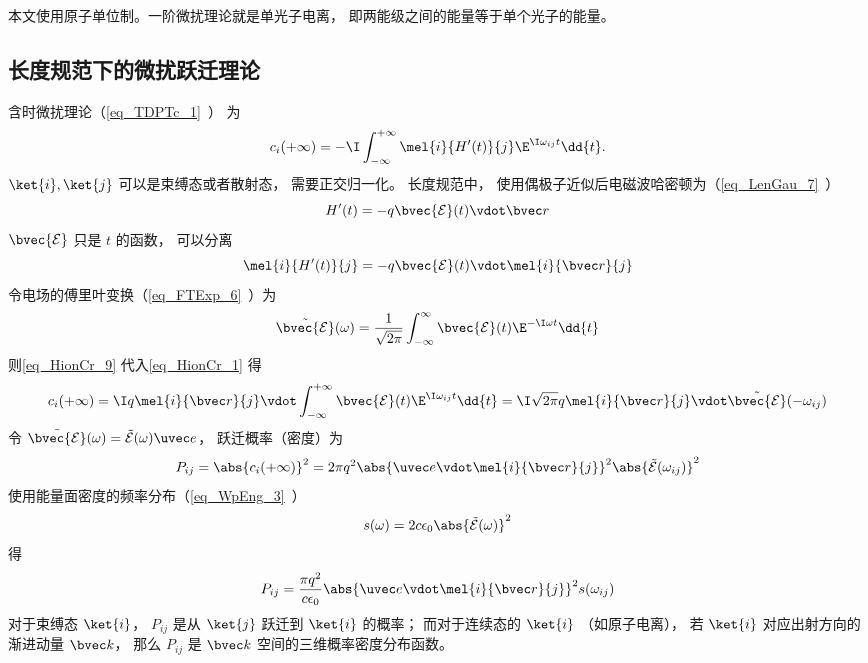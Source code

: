 

本文使用原子单位制。一阶微扰理论就是单光子电离， 即两能级之间的能量等于单个光子的能量。

\subsection{长度规范下的微扰跃迁理论}
含时微扰理论（\autoref{eq_TDPTc_1}~） 为
\begin{equation}\label{eq_HionCr_1}
c_i(+\infty) = -\I \int_{-\infty}^{+\infty} \mel{i}{H'(t)}{j} \E^{\I\omega_{ij} t} \dd{t}.
\end{equation}
$\ket{i},\ket{j}$ 可以是束缚态或者散射态， 需要正交归一化。 长度规范中， 使用偶极子近似后电磁波哈密顿为（\autoref{eq_LenGau_7}~）
\begin{equation}
H'(t) = -q\bvec {\mathcal E}(t) \vdot \bvec r
\end{equation}
$\bvec {\mathcal E}$ 只是 $t$ 的函数， 可以分离
\begin{equation}\label{eq_HionCr_9}
\mel{i}{H'(t)}{j} = -q\bvec {\mathcal E}(t) \vdot \mel{i}{\bvec r}{j}
\end{equation}
令电场的傅里叶变换（\autoref{eq_FTExp_6}~）为
\begin{equation}
\tilde {\bvec {\mathcal E}}(\omega) = \frac{1}{\sqrt{2\pi}} \int_{-\infty}^{\infty} \bvec {\mathcal E}(t) \E^{-\I\omega t} \dd{t}
\end{equation}
则\autoref{eq_HionCr_9} 代入\autoref{eq_HionCr_1} 得
\begin{equation}\label{eq_HionCr_7}
c_i(+\infty) = \I q \mel{i}{\bvec r}{j} \vdot \int_{-\infty}^{+\infty} \bvec {\mathcal E}(t) \E^{\I\omega_{ij} t} \dd{t} = \I \sqrt{2\pi} q \mel{i}{\bvec r}{j} \vdot \tilde {\bvec {\mathcal E}}(-\omega_{ij})
\end{equation}
令 $\tilde {\bvec {\mathcal E}}(\omega) = \tilde {{\mathcal E}}(\omega)\uvec e$， 跃迁概率（密度）为
\begin{equation}\label{eq_HionCr_2}
P_{ij} = \abs{c_i(+\infty)}^2 = 2\pi q^2 \abs{\uvec e \vdot \mel{i}{\bvec r}{j}}^2 \abs{\tilde {{\mathcal E}}(\omega_{ij})}^2
\end{equation}
使用能量面密度的频率分布（\autoref{eq_WpEng_3}~）
\begin{equation}\label{eq_HionCr_8}
s(\omega) = 2c\epsilon_0 \abs{\tilde {{\mathcal E}}(\omega)}^2
\end{equation}
得
\begin{equation}\label{eq_HionCr_6}
P_{ij} = \frac{\pi q^2}{c\epsilon_0} \abs{\uvec e \vdot\mel{i}{\bvec r}{j}}^2 s(\omega_{ij})
\end{equation}
对于束缚态 $\ket{i}$， $P_{ij}$ 是从 $\ket{j}$ 跃迁到 $\ket{i}$ 的概率； 而对于连续态的 $\ket{i}$ （如原子电离）， 若 $\ket{i}$ 对应出射方向的渐进动量 $\bvec k$， 那么 $P_{ij}$ 是 $\bvec k$ 空间的三维概率密度分布函数。

